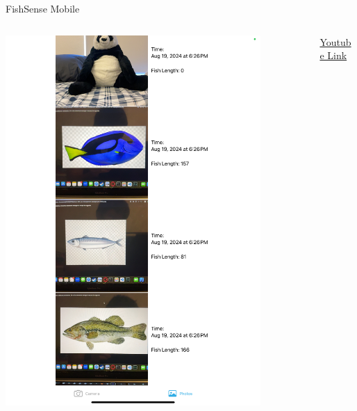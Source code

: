\begin{frame}{FishSense Mobile}
    \begin{columns}
        \begin{column}{0.5\textwidth}
            \centering
            \includegraphics[height=0.85\textheight,width=0.85\textwidth,keepaspectratio]{images/iPad.jpeg}
        \end{column}
        \begin{column}{0.5\textwidth}
            \href{https://www.youtube.com/shorts/Q-dP97_H-QA}{Youtube Link}
        \end{column}
    \end{columns}
\end{frame}

